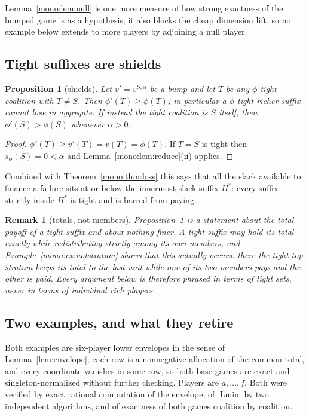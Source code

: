 \documentclass[11pt]{article}
\newtheorem{proposition}[theorem]{Proposition}
\newtheorem{remark}[theorem]{Remark}
\newcommand{\Lmin}{\operatorname{Lmin}}
\begin{document}
Lemma~\ref{mono:lem:null} is one more measure of how strong exactness of the
bumped game is as a hypothesis; it also blocks the cheap dimension lift, so
no example below extends to more players by adjoining a null player.

\subsection{Tight suffixes are shields}

\begin{proposition}[shields]\label{mono:prop:shield}
Let $v'=v^{S,\alpha}$ be a bump and let $T$ be any $\phi$-tight coalition
with $T\ne S$.  Then $\phi'(T)\ge\phi(T)$; in particular a $\phi$-tight
richer suffix cannot lose in aggregate.  If instead the tight coalition is
$S$ itself, then $\phi'(S)>\phi(S)$ whenever $\alpha>0$.
\end{proposition}

\begin{proof}
$\phi'(T)\ge v'(T)=v(T)=\phi(T)$.  If $T=S$ is tight then
$s_\phi(S)=0<\alpha$ and Lemma~\ref{mono:lem:reduce}(ii) applies.
\end{proof}

Combined with Theorem~\ref{mono:thm:loss} this says that all the slack
available to finance a failure sits at or below the innermost slack suffix
$H^*$: every suffix strictly inside $H^*$ is tight and is barred from paying.

\begin{remark}[totals, not members]\label{mono:rem:totals}
Proposition~\ref{mono:prop:shield} is a statement about the total payoff of a
tight suffix and about nothing finer.  A tight suffix may hold its total
exactly while redistributing strictly among its own members, and
Example~\ref{mono:ex:notstratum} shows that this actually occurs: there the
tight top stratum keeps its total to the last unit while one of its two
members pays and the other is paid.  Every argument below is therefore
phrased in terms of tight sets, never in terms of individual rich players.
\end{remark}

\subsection{Two examples, and what they retire}

Both examples are six-player lower envelopes in the sense of
Lemma~\ref{lem:envelope}; each row is a nonnegative allocation of the common
total, and every coordinate vanishes in some row, so both base games are
exact and singleton-normalized without further checking.  Players are
$a,\dots,f$.  Both were verified by exact rational computation of the
envelope, of $\Lmin$ by two independent algorithms, and of exactness of both
games coalition by coalition.
\end{document}
